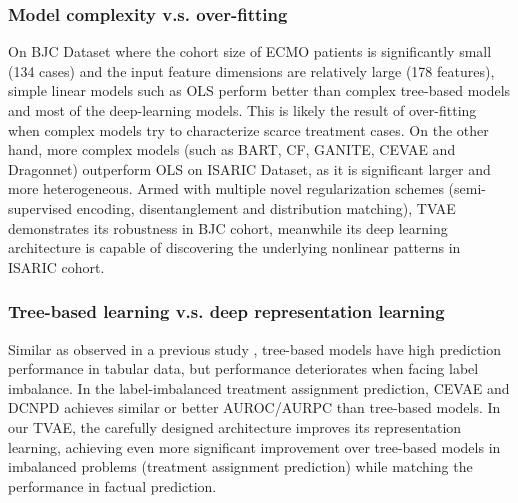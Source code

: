 \subsubsection{Model complexity v.s. over-fitting} 
On BJC Dataset where the cohort size of ECMO patients is significantly small (134 cases) and the input feature dimensions are relatively large (178 features), simple linear models such as OLS perform better than complex tree-based models and most of the deep-learning models. This is likely the result of over-fitting when complex models try to characterize scarce treatment cases. On the other hand, more complex models (such as BART, CF, GANITE, CEVAE and Dragonnet) outperform OLS on ISARIC Dataset, as it is significant larger and more heterogeneous. Armed with multiple novel regularization schemes (semi-supervised encoding, disentanglement and distribution matching), TVAE demonstrates its robustness in BJC cohort, meanwhile its deep learning architecture is capable of discovering the underlying nonlinear patterns in ISARIC cohort. 
\subsubsection{Tree-based learning v.s. deep representation learning}
Similar as observed in a previous study \cite{grinsztajn2022tabular,xue2021use}, tree-based models have high prediction performance in tabular data, but performance deteriorates when facing label imbalance. In the label-imbalanced treatment assignment prediction, CEVAE and DCNPD achieves similar or better AUROC/AURPC than tree-based models. In our TVAE, the carefully designed architecture improves its representation learning, achieving even more significant improvement over tree-based models in imbalanced problems (treatment assignment prediction) while matching the performance in factual prediction. 

